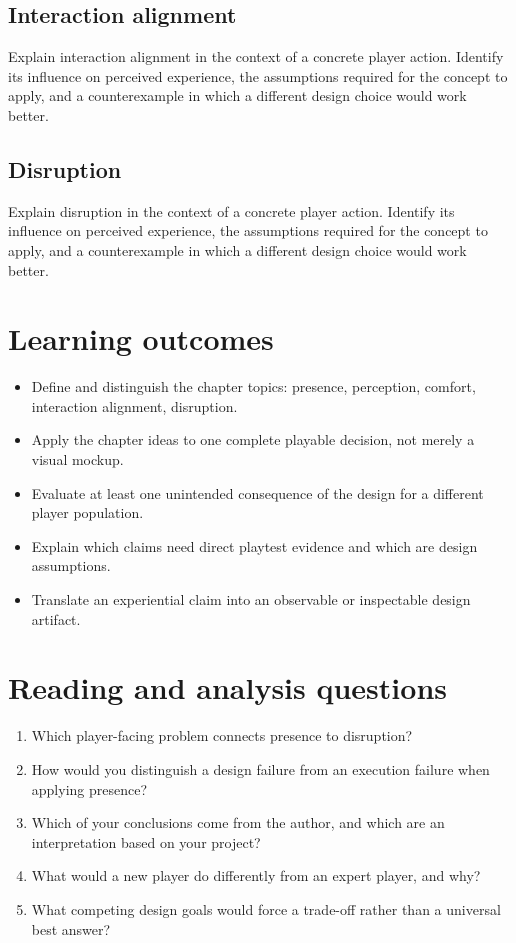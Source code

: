 \documentclass[11pt]{article}
\begin{document}
\subsection{Interaction alignment}
Explain interaction alignment in the context of a concrete player action. Identify its influence on perceived experience, the assumptions required for the concept to apply, and a counterexample in which a different design choice would work better.


\subsection{Disruption}
Explain disruption in the context of a concrete player action. Identify its influence on perceived experience, the assumptions required for the concept to apply, and a counterexample in which a different design choice would work better.


\section{Learning outcomes}
\begin{itemize}
\item Define and distinguish the chapter topics: presence, perception, comfort, interaction alignment, disruption.
\item Apply the chapter ideas to one complete playable decision, not merely a visual mockup.
\item Evaluate at least one unintended consequence of the design for a different player population.
\item Explain which claims need direct playtest evidence and which are design assumptions.
\item Translate an experiential claim into an observable or inspectable design artifact.
\end{itemize}

\section{Reading and analysis questions}
\begin{enumerate}
\item Which player-facing problem connects presence to disruption?
\item How would you distinguish a design failure from an execution failure when applying presence?
\item Which of your conclusions come from the author, and which are an interpretation based on your project?
\item What would a new player do differently from an expert player, and why?
\item What competing design goals would force a trade-off rather than a universal best answer?
\end{enumerate}
\end{document}
